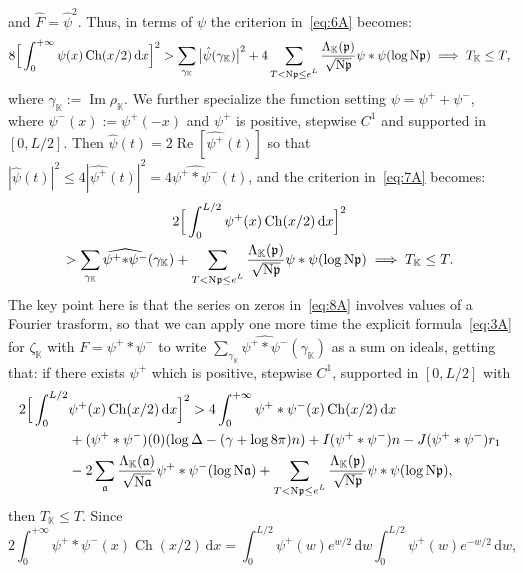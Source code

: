 \documentclass[a4paper,11pt]{amsart}
\newcommand{\field}[1]{\mathbb{{#1}}}
\newcommand{\ideal}[1]{\mathfrak{{#1}}}
\newcommand{\K}{\field{{K}}}
\newcommand{\p}{\ideal{p}}
\renewcommand{\a}{\ideal{a}}
\newcommand{\Norm}{\textrm{\upshape N}}
\newcommand{\dd}{\,\mathrm{d}}
\DeclareMathOperator{\Imm}{Im}
\DeclareMathOperator{\Ree}{Re}
\DeclareMathOperator{\Ch}{Ch}
\theoremstyle{remark}
\begin{document}
and $\hat{F} = \hat{\psi}^2$. Thus, in terms of $\psi$ the criterion in~\eqref{eq:6A} becomes:
\begin{equation}\label{eq:7A}
8 \Big[\int_{0}^{+\infty} \psi(x)\Ch(x/2)\dd x\Big]^2
   > \sum_{\gamma_\K} \big|\hat{\psi}(\gamma_\K)\big|^2
    + 4\sum_{\substack{T< \Norm\p \leq e^L}} \frac{\Lambda_{\K}(\p)}{\sqrt{\Norm\p}} \psi\ast\psi(\log \Norm\p)
\implies
T_\K \leq T,
\end{equation}
where $\gamma_\K :=\Imm \rho_\K$. We further specialize the function setting $\psi = \psi^+ +
\psi^-$, where $\psi^-(x):=\psi^+(-x)$ and $\psi^+$ is positive, stepwise $C^1$ and supported in
$[0,L/2]$.
%
Then $\hat{\psi}(t) = 2\Ree[\widehat{\psi^+}(t)]$ so that $|\hat{\psi}(t)|^2 \leq 4
|\widehat{\psi^+}(t)|^2 = 4\widehat{\psi^+\ast\psi^-}(t)$, and the criterion in~\eqref{eq:7A} becomes:
%
\begin{multline}\label{eq:8A}
2\Big[\int_{0}^{L/2} \psi^+(x)\Ch(x/2) \dd x \Big]^2\\
> \sum_{\gamma_\K} \widehat{\psi^{+}{\ast}\psi^{-}}(\gamma_\K)
    + \sum_{\substack{T< \Norm\p \leq e^L}} \frac{\Lambda_{\K}(\p)}{\sqrt{\Norm\p}} \psi\ast\psi(\log \Norm\p)
%
\implies
%
T_\K \leq T.
\end{multline}
The key point here is that the series on zeros in~\eqref{eq:8A} involves values of a Fourier trasform, so
that we can apply one more time the explicit formula~\eqref{eq:3A} for $\zeta_\K$ with $F =
\psi^+\ast\psi^-$ to write $\sum_{\gamma_\K} \widehat{\psi^{+}{\ast}\psi^{-}}(\gamma_\K)$ as a sum on
ideals, getting that:
%
if there exists $\psi^+$ which is positive, stepwise $C^1$, supported in $[0,L/2]$ with
%
\begin{align*}
2\Big[\int_{0}^{L/2} &\psi^+(x)\Ch(x/2) \dd x \Big]^2
>  4 \int_0^{+\infty} \psi^+\ast\psi^-(x)\Ch(x/2)\dd x                                                         \\
&
   + (\psi^+\ast\psi^-)(0)(\log \Delta - (\gamma+\log 8\pi)n)
%
   + I(\psi^+\ast\psi^-) n
   - J(\psi^+\ast\psi^-) r_1                                                                                   \\
&
   - 2\sum_{\a} \frac{\Lambda_{\K}(\a)}{\sqrt{\Norm\a}} \psi^+\ast\psi^-(\log\Norm\a)
   +  \sum_{\substack{T< \Norm\p \leq e^L}} \frac{\Lambda_{\K}(\p)}{\sqrt{\Norm\p}} \psi\ast\psi(\log \Norm\p),
\end{align*}
%
then $T_\K \leq T$.
Since
\[
2\int_0^{+\infty} \psi^+\ast\psi^-(x) \Ch(x/2) \dd x
 = \int_{0}^{L/2} \psi^+(w)e^{w/2} \dd w \int_{0}^{L/2} \psi^+(w) e^{-w/2} \dd w,
\]
\end{document}
